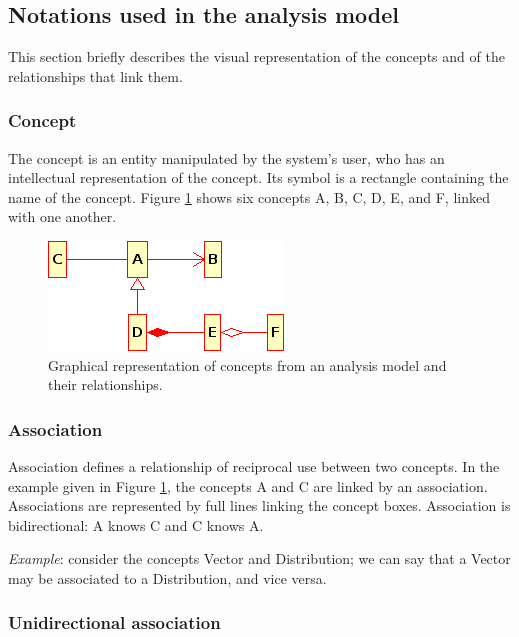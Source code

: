 \label{notations}\subsection{Notations used in the analysis model}

This section briefly describes the visual representation of the concepts and of the relationships that link them.

\subsubsection{Concept}

The concept is an entity manipulated by the system's user, who has an intellectual representation of the concept. Its symbol is a rectangle containing the name of the concept. Figure \ref{fig:linking_concepts} shows six concepts A, B, C, D, E, and F, linked with one another.

\begin{figure}[htb]
  \begin{center}
    \includegraphics[scale=0.9]{Figures/analysis/linking_concepts.png}
    \caption{Graphical representation of concepts from an analysis model and their relationships.}\label{fig:linking_concepts}
  \end{center}
\end{figure}

\subsubsection{Association}

Association defines a relationship of reciprocal use between two concepts. In the example given in Figure \ref{fig:linking_concepts}, the concepts A and C are linked by an association. Associations are represented by full lines linking the concept boxes. Association is bidirectional: A knows C and C knows A.

\emph{Example}: consider the concepts Vector and Distribution; we can say that a Vector may be associated to a Distribution, and vice versa.

\subsubsection{Unidirectional association}

